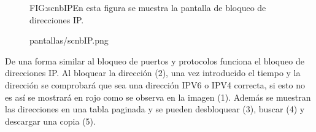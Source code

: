 \begin{figure}[Pantalla de bloqueo de direcciones IP]{FIG:scnbIP}{En esta figura se muestra la pantalla de bloqueo de direcciones IP.}
  \begin{image}{}{}{pantallas/scnbIP.png}
  \end{image}
\end{figure}
\break
De una forma similar al bloqueo de puertos y protocolos funciona el bloqueo de direcciones IP. Al bloquear la dirección (2), una vez introducido el tiempo y la dirección se comprobará que sea una dirección IPV6 o IPV4 correcta, si esto no es así se mostrará en rojo como se observa en la imagen (1). Además se muestran las direcciones en una tabla paginada y se pueden desbloquear (3), buscar (4) y descargar una copia (5).